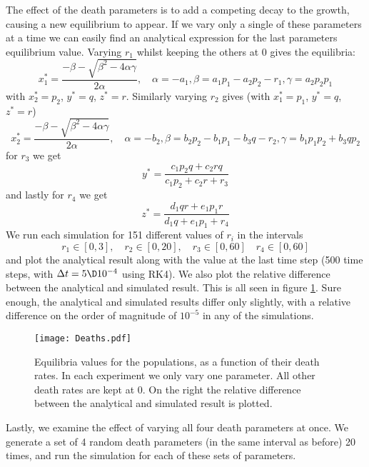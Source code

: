\documentclass[a4paper,10pt]{article}
\begin{document}
	The effect of the death parameters is to add a competing decay to the growth, causing a new equilibrium to appear. If we vary only a single of these parameters at a time we can easily find an analytical expression for the last parameters equilibrium value. Varying $ r_1 $ whilst keeping the others at 0 gives the equilibria:
	\begin{equation}
		x_1^* = \frac{-\beta - \sqrt{\beta^2 - 4\alpha \gamma}}{2 \alpha}, \quad \alpha=-a_1, \beta = a_1p_1-a_2p_2-r_1, \gamma =a_2p_2p_1
	\end{equation}
	with $ x_2^* = p_2 $, $ y^* = q $, $ z^* = r $. Similarly varying $ r_2 $ gives (with $ x_1^* = p_1 $, $ y^* = q $, $ z^* = r $)
	\begin{equation}
		x_2^* = \frac{-\beta - \sqrt{\beta^2 - 4\alpha \gamma}}{2 \alpha}, \quad \alpha=-b_2, \beta = b_2p_2-b_1p_1-b_3q-r_2, \gamma =b_1p_1p_2 + b_3qp_2
	\end{equation}
	for $ r_3 $ we get
	\begin{equation}
		y^* = \frac{c_1p_2q+c_2rq}{c_1p_2 + c_2r+r_3}
	\end{equation}
	and lastly for $ r_4 $ we get
	\begin{equation}
		z^* = \frac{d_1 q r + e_1p_1r}{d_1q+e_1p_1+r_4}
	\end{equation}
	We run each simulation for 151 different values of $ r_i $ in the intervals
	\begin{equation}
		r_1 \in [0,3], \quad r_2 \in [0, 20], \quad r_3 \in [0, 60] \quad r_4 \in [0, 60]
	\end{equation}
	and plot the analytical result along with the value at the last time step (500 time steps, with $ \Delta t = 5\D10^{-4} $ using RK4). We also plot the relative difference between the analytical and simulated result. This is all seen in figure \ref{fig:deaths1}. Sure enough, the analytical and simulated results differ only slightly, with a relative difference on the order of magnitude of $ 10^{-5} $ in any of the simulations.
	
	\begin{figure}[H]
		\centering
		\texttt{[image: Deaths.pdf]}
		\caption{Equilibria values for the populations, as a function of their death rates. In each experiment we only vary one parameter. All other death rates are kept at 0. On the right the relative difference between the analytical and simulated result is plotted.}
		\label{fig:deaths1}
	\end{figure}

	Lastly, we examine the effect of varying all four death parameters at once. We generate a set of 4 random death parameters (in the same interval as before) 20 times, and run the simulation for each of these sets of parameters.
	
\end{document}
